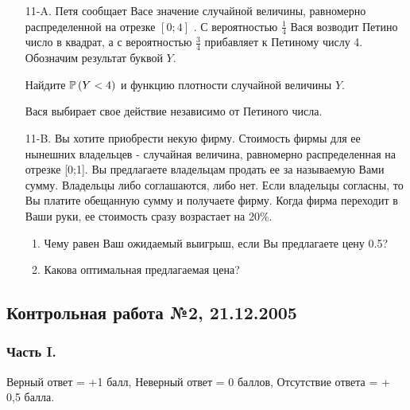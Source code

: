 \documentclass[12pt, a4paper]{article}\usepackage[]{graphicx}\usepackage[]{color}
\begin{document}
\begin{enumerate}
\item[11-A.] Петя сообщает Васе значение случайной величины, равномерно распределенной на отрезке  $[0;4]$ . С вероятностью  $\frac{1}{4} $  Вася возводит Петино число в квадрат, а с вероятностью  $\frac{3}{4} $  прибавляет к Петиному числу 4. Обозначим результат буквой  $Y$.

Найдите  $\P\left(Y<4\right)$  и функцию плотности случайной величины  $Y$.

Вася выбирает свое действие независимо от Петиного числа.

\item[11-B.] Вы хотите приобрести некую фирму. Стоимость фирмы для ее нынешних владельцев - случайная величина, равномерно распределенная на отрезке [0;1]. Вы предлагаете владельцам продать ее за называемую Вами сумму. Владельцы либо соглашаются, либо нет. Если владельцы согласны, то Вы платите обещанную сумму и получаете фирму. Когда фирма переходит в Ваши руки, ее стоимость сразу возрастает на 20\%.
\begin{enumerate}
\item Чему равен Ваш ожидаемый выигрыш, если Вы предлагаете цену 0.5?
\item Какова оптимальная предлагаемая цена?
\end{enumerate}
\end{enumerate}

\subsection{Контрольная работа №2, 21.12.2005}




\subsubsection*{Часть I.}

Верный ответ = +1 балл, Неверный ответ = 0 баллов, Отсутствие ответа = + 0,5 балла.
\end{document}
